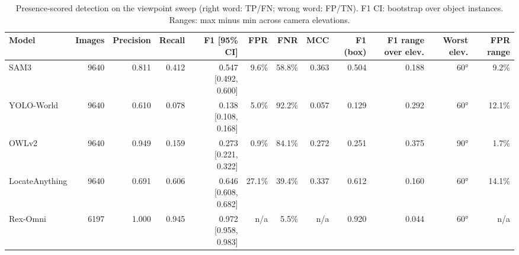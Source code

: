 \begin{table}[t]
\centering
\small
\begin{tabular}{lrrrrrrrrrrr}
\toprule
Model & Images & Precision & Recall & F1 [95\% CI] & FPR & FNR & MCC & F1 (box) & F1 range over elev. & Worst elev. & FPR range \\
\midrule
SAM3 & 9640 & 0.811 & 0.412 & 0.547 [0.492, 0.600] & 9.6\% & 58.8\% & 0.363 & 0.504 & 0.188 & 60° & 9.2\% \\
YOLO-World & 9640 & 0.610 & 0.078 & 0.138 [0.108, 0.168] & 5.0\% & 92.2\% & 0.057 & 0.129 & 0.292 & 60° & 12.1\% \\
OWLv2 & 9640 & 0.949 & 0.159 & 0.273 [0.221, 0.322] & 0.9\% & 84.1\% & 0.272 & 0.251 & 0.375 & 90° & 1.7\% \\
LocateAnything & 9640 & 0.691 & 0.606 & 0.646 [0.608, 0.682] & 27.1\% & 39.4\% & 0.337 & 0.612 & 0.160 & 60° & 14.1\% \\
Rex-Omni & 6197 & 1.000 & 0.945 & 0.972 [0.958, 0.983] & n/a & 5.5\% & n/a & 0.920 & 0.044 & 60° & n/a \\
\bottomrule
\end{tabular}
\caption{Presence-scored detection on the viewpoint sweep (right word: TP/FN; wrong word: FP/TN). F1 CI: bootstrap over object instances. Ranges: max minus min across camera elevations.}
\end{table}
